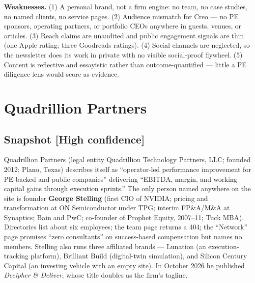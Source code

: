 \documentclass[11pt]{article}
\newcommand{\high}{\textcolor{green!45!black}{\textbf{[High confidence]}}}
\begin{document}
\textbf{Weaknesses.} (1) A personal brand, not a firm engine: no team, no case
studies, no named clients, no service pages. (2) Audience mismatch for Creo --- no PE
sponsors, operating partners, or portfolio CEOs anywhere in guests, venues, or
articles. (3) Reach claims are unaudited and public engagement signals are thin (one
Apple rating; three Goodreads ratings). (4) Social channels are neglected, so the
newsletter does its work in private with no visible social-proof flywheel. (5)
Content is reflective and essayistic rather than outcome-quantified --- little a PE
diligence lens would score as evidence.

\section{Quadrillion Partners}

\subsection{Snapshot \high}
Quadrillion Partners (legal entity Quadrillion Technology Partners, LLC; founded 2012;
Plano, Texas) describes itself as ``operator-led performance improvement for PE-backed
and public companies'' delivering ``EBITDA, margin, and working capital gains through
execution sprints.'' The only person named anywhere on the site is founder
\textbf{George Stelling} (first CIO of NVIDIA; pricing and transformation at ON
Semiconductor under TPG; interim FP\&A/M\&A at Synaptics; Bain and PwC; co-founder of
Prophet Equity, 2007--11; Tuck MBA). Directories list about six employees; the team
page returns a 404; the ``Network'' page promises ``zero consultants'' on
success-based compensation but names no members. Stelling also runs three affiliated
brands --- Lunation (an execution-tracking platform), Brilliant Build (digital-twin
simulation), and Silicon Century Capital (an investing vehicle with an empty site).
In October 2026 he published \emph{Decipher \& Deliver}, whose title doubles as the
firm's tagline.
\end{document}
